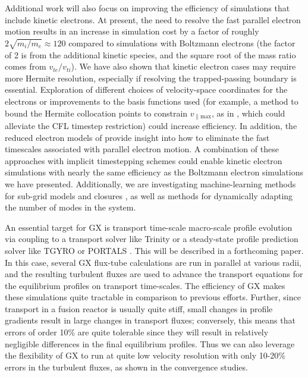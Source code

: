 \documentclass{jpp}
\newcommand{\GX}{{GX}\xspace}
\begin{document}
Additional work will also focus on improving the efficiency of simulations that include kinetic electrons. At present, the need to resolve the fast parallel electron motion results in an increase in simulation cost by a factor of roughly $2\sqrt{m_i/m_e}\approx 120$ compared to simulations with Boltzmann electrons (the factor of 2 is from the additional kinetic species, and the square root of the mass ratio comes from $v_{te}/v_{ti}$). We have also shown that kinetic electron cases may require more Hermite resolution, especially if resolving the trapped-passing boundary is essential. Exploration of different choices of velocity-space coordinates for the electrons or improvements to the basis functions used (for example, a method to bound the Hermite collocation points to constrain $v_{\parallel\mathrm{max}}$, as in \citet{Candy2016}, which could alleviate the CFL timestep restriction) could increase efficiency. In addition, the reduced electron models of \citet{Beer1996, Snyder2001, Abel2013a} provide insight into how to eliminate the fast timescales associated with parallel electron motion. A combination of these approaches with implicit timestepping schemes could enable kinetic electron simulations with nearly the same efficiency as the Boltzmann electron simulations we have presented. {\color{black} Additionally, we are investigating machine-learning methods for sub-grid models and closures \citep{barbour2021,barbour2022}, as well as methods for dynamically adapting the number of modes in the system.}

An essential target for \GX is transport time-scale macro-scale profile evolution via coupling to a transport solver like Trinity \citep{Barnes2009, Qian2022} {\color{black} or a steady-state profile prediction solver like TGYRO \citep{Candy2009} or PORTALS \citep{Rodriguez-Fernandez2022}}. This will be described in a forthcoming paper. In this case, several \GX flux-tube calculations are run in parallel at various radii, and the resulting turbulent fluxes are used to advance the transport equations for the equilibrium profiles on transport time-scales. The efficiency of \GX makes these simulations quite tractable in comparison to previous efforts. Further, since transport in a fusion reactor is usually quite stiff, small changes in profile gradients result in large changes in transport fluxes; conversely, this means that errors of order 10\% are quite tolerable since they will result in relatively negligible differences in the final equilibrium profiles. Thus we can also leverage the flexibility of \GX to run at quite low velocity resolution with only 10-20\% errors in the turbulent fluxes, as shown in the convergence studies.
\end{document}
